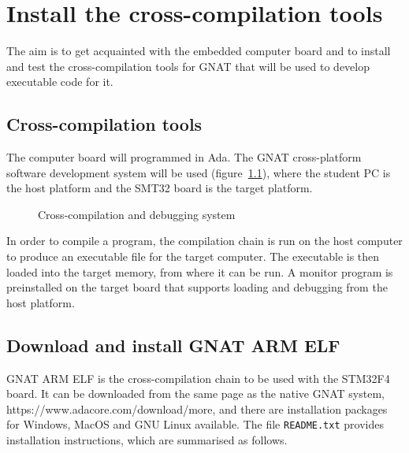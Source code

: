 
\chapter{Install the cross-compilation tools}\label{ch:Assignment2}

The aim is to get acquainted with the embedded computer board and to install and test the cross-compilation tools for GNAT that will be used to develop executable code for it.

\section{Cross-compilation tools}

The computer board will programmed in Ada. The GNAT cross-platform software development system will be used (figure~\ref{fig:cross}), where the student PC is the host platform and the SMT32 board is the target platform.

\begin{figure}[h]
            \caption{Cross-compilation and debugging system}
            \label{fig:cross}
\end{figure}

In order to compile a program, the compilation chain is run on the host computer to produce an executable file for the target computer. The executable is then loaded into the target memory, from where it can be run. A monitor program is preinstalled on the target board that supports loading and debugging from the host platform.

\section{Download and install GNAT ARM ELF}

GNAT ARM ELF is the cross-compilation chain to be used with the STM32F4 board. It can be downloaded from the same page as the native GNAT system, https://www.adacore.com/download/more, and there are installation packages for Windows, MacOS and GNU Linux available. The file {\tt README.txt} provides installation instructions, which are summarised as follows.
